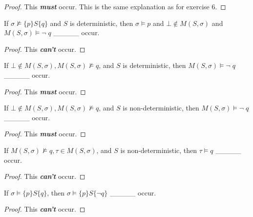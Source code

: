 \documentclass[12pt]{article}
\newenvironment{exercise}[2][Exercise]{\begin{trivlist}
\item[\hskip \labelsep {\bfseries #1}\hskip \labelsep {\bfseries #2.}]}{\end{trivlist}}
\begin{document}
\begin{proof}
This \textit{\textbf{must}} occur. This is the same explanation as for exercise 6.
\end{proof}

\begin{exercise}{8}
If $\sigma \not\models \{p\}S\{q\}$ and $S$ is deterministic, then $\sigma \models p$ and $\bot \not\in M(S, \sigma)$ and $M(S, \sigma) \models \neg\; q$ \_\_\_\_\_ occur.
\end{exercise}

\begin{proof}
This \textit{\textbf{can't}} occur.
\end{proof}

\begin{exercise}{9}
If $\bot \not\in M(S, \sigma), M(S, \sigma) \not\models q$, and $S$ is deterministic, then $M(S, \sigma) \models \neg\; q$ \_\_\_\_\_ occur.
\end{exercise}

\begin{proof}
This \textit{\textbf{must}} occur.
\end{proof}

\begin{exercise}{10}
If $\bot \not\in M(S, \sigma), M(S, \sigma) \not\models q$, and $S$ is non-deterministic, then $M(S, \sigma) \models \neg\; q$ \_\_\_\_\_ occur.
\end{exercise}

\begin{proof}
This \textit{\textbf{must}} occur.
\end{proof}

\begin{exercise}{11}
If $M(S, \sigma) \not\models q, \tau \in M(S,\sigma)$, and $S$ is non-deterministic, then $\tau \models q$ \_\_\_\_\_ occur. 
\end{exercise}

\begin{proof}
This \textit{\textbf{can't}} occur.
\end{proof}

\begin{exercise}{12}
If $\sigma \models \{p\}S\{q\}$, then $\sigma \models \{p\}S\{\neg q\}$ \_\_\_\_\_ occur.
\end{exercise}

\begin{proof}
This \textit{\textbf{can't}} occur.
\end{proof}
\end{document}
